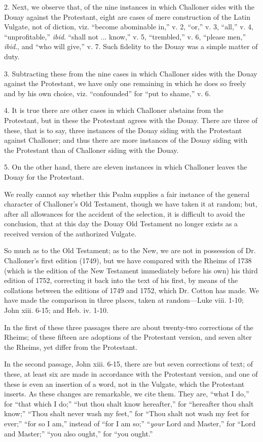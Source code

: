 2. Next, we observe that, of the nine instances in which Challoner
sides with the Douay against the Protestant, eight are cases of mere
construction of the Latin Vulgate, not of diction, viz. ``become
abominable in,'' v. 2, ``or,'' v. 3, ``all,'' v.
4, ``unprofitable,'' \emph{ibid}. ``shall not ...
know,'' v. 5, ``trembled,'' v. 6, ``please men,'' \emph{ibid}.,
and ``who will give,'' v. 7. Such fidelity to the Douay was a
simple matter of duty.

3. Subtracting these from the nine cases in which Challoner sides
with the Douay against the Protestant, we have only one remaining in
which he does so freely and by his own choice, viz.
``confounded'' for ``put to shame,'' v. 6.

4. It is true there are other cases in which Challoner abstains
from the Protestant, but in these the Protestant agrees with the Douay.
There are three of these, that is to say, three instances of the Douay
siding with the Protestant against Challoner; and thus there are more
instances of the Douay siding with the Protestant than of Challoner
siding with the Douay.

5. On the other hand, there are eleven instances in which Challoner
leaves the Douay for the Protestant.

We really cannot say whether this Psalm supplies a fair instance of
the general character of Challoner's Old Testament, though we have
taken it at random; but, after all allowances for the accident of the
selection, it is difficult to avoid the conclusion, that at this day
the Douay Old Testament no longer exists as a received version
of the authorized Vulgate.

So much as to the Old Testament; as to the New, we are not in
possession of Dr. Challoner's first edition (1749), but we have
compared with the Rheims of 1738 (which is the edition of the New
Testament immediately before his own) his third edition of 1752,
correcting it back into the text of his first, by means of the
collations between the editions of 1749 and 1752, which Dr. Cotton has
made. We have made the comparison in three places, taken at random—Luke
viii. 1-10; John xiii. 6-15; and Heb. iv. 1-10.

In the first of these three passages there are about twenty-two
corrections of the Rheims; of these fifteen are adoptions of the
Protestant version, and seven alter the Rheims, yet differ from the
Protestant.

In the second passage, John xiii. 6-15, there are but seven
corrections of text; of these, at least six are made in accordance
with the Protestant version, and one of these is even an insertion of
a word, not in the Vulgate, which the Protestant inserts. As these
changes are remarkable, we cite them. They are, ``what I do,''
for ``that which I do;'' ``but thou shalt know
hereafter,'' for ``hereafter thou shalt know;'' ``Thou
shalt never wash my feet,'' for ``Thou shalt not wash my feet
for ever;'' ``for so I am,'' instead of ``for I am
so;'' ``\emph{your} Lord and Master,'' for ``Lord and
Master;'' ``you also ought,'' for ``you ought.''


